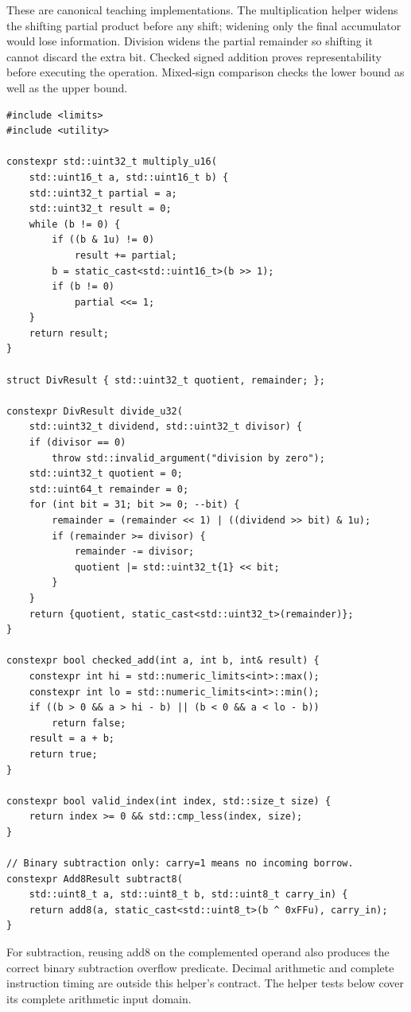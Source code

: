 These are canonical teaching implementations. The multiplication helper widens the shifting partial product before any shift; widening only the final accumulator would lose information. Division widens the partial remainder so shifting it cannot discard the extra bit. Checked signed addition proves representability before executing the operation. Mixed-sign comparison checks the lower bound as well as the upper bound.

\begin{verbatim}
#include <limits>
#include <utility>

constexpr std::uint32_t multiply_u16(
    std::uint16_t a, std::uint16_t b) {
    std::uint32_t partial = a;
    std::uint32_t result = 0;
    while (b != 0) {
        if ((b & 1u) != 0)
            result += partial;
        b = static_cast<std::uint16_t>(b >> 1);
        if (b != 0)
            partial <<= 1;
    }
    return result;
}

struct DivResult { std::uint32_t quotient, remainder; };

constexpr DivResult divide_u32(
    std::uint32_t dividend, std::uint32_t divisor) {
    if (divisor == 0)
        throw std::invalid_argument("division by zero");
    std::uint32_t quotient = 0;
    std::uint64_t remainder = 0;
    for (int bit = 31; bit >= 0; --bit) {
        remainder = (remainder << 1) | ((dividend >> bit) & 1u);
        if (remainder >= divisor) {
            remainder -= divisor;
            quotient |= std::uint32_t{1} << bit;
        }
    }
    return {quotient, static_cast<std::uint32_t>(remainder)};
}

constexpr bool checked_add(int a, int b, int& result) {
    constexpr int hi = std::numeric_limits<int>::max();
    constexpr int lo = std::numeric_limits<int>::min();
    if ((b > 0 && a > hi - b) || (b < 0 && a < lo - b))
        return false;
    result = a + b;
    return true;
}

constexpr bool valid_index(int index, std::size_t size) {
    return index >= 0 && std::cmp_less(index, size);
}

// Binary subtraction only: carry=1 means no incoming borrow.
constexpr Add8Result subtract8(
    std::uint8_t a, std::uint8_t b, std::uint8_t carry_in) {
    return add8(a, static_cast<std::uint8_t>(b ^ 0xFFu), carry_in);
}
\end{verbatim}

For subtraction, reusing add8 on the complemented operand also produces the correct binary subtraction overflow predicate. Decimal arithmetic and complete instruction timing are outside this helper's contract. The helper tests below cover its complete arithmetic input domain.

